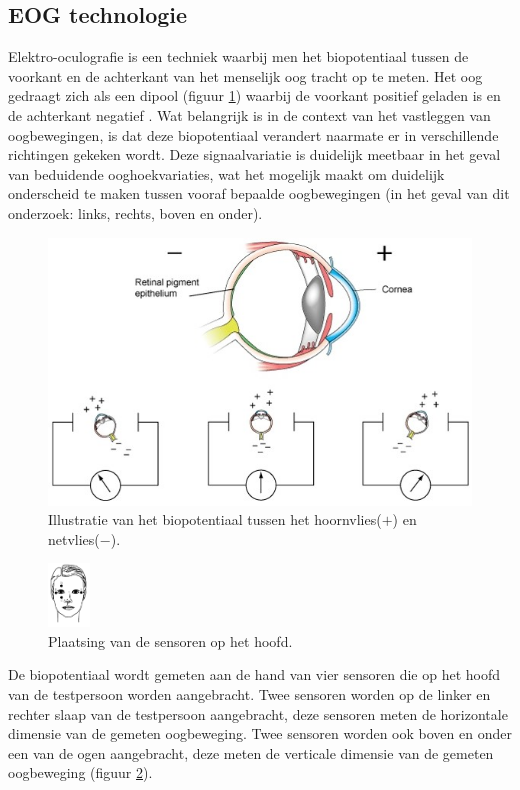 \documentclass{article}
\begin{document}
\subsection{EOG technologie}
Elektro-oculografie is een techniek waarbij men het biopotentiaal tussen de voorkant en de achterkant van het menselijk oog tracht  op te meten.  Het oog gedraagt zich als een dipool (figuur \ref{fig:oogdipool}) waarbij de voorkant positief geladen is en de achterkant negatief \cite{yagi:eoginterface}. Wat belangrijk is in de context van het vastleggen van oogbewegingen, is dat deze biopotentiaal verandert naarmate er in verschillende richtingen gekeken wordt. Deze signaalvariatie is duidelijk meetbaar in het geval van beduidende ooghoekvariaties, wat het mogelijk maakt om duidelijk onderscheid te maken tussen vooraf bepaalde oogbewegingen (in het geval van dit onderzoek: links, rechts, boven en onder).
\begin{figure}[H]
	\centering
	\includegraphics[width=0.8\linewidth]{images/oogdipool}
	\caption{Illustratie van het biopotentiaal tussen het hoornvlies($+$) en netvlies($-$).\protect\cite{kulEGO}}
	\label{fig:oogdipool}
\end{figure}
\begin{figure}
	\begin{center}
		\includegraphics[width=0.1\textwidth]{images/sensorplaatsing}
		\caption{Plaatsing van de sensoren op het hoofd.\protect\cite{Barea:eogmobility}}
		\label{fig:sensorplaatsing}
	\end{center}
\end{figure}
De biopotentiaal wordt gemeten aan de hand van vier sensoren die op het hoofd van de testpersoon worden aangebracht. Twee sensoren worden op de linker en rechter slaap van de testpersoon aangebracht, deze sensoren meten de horizontale dimensie van de gemeten oogbeweging. Twee sensoren worden ook boven en onder een van de ogen aangebracht, deze meten de verticale dimensie van de gemeten oogbeweging (figuur \ref{fig:sensorplaatsing}).
\end{document}
